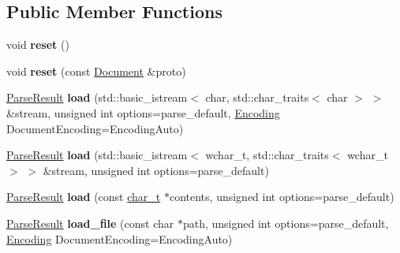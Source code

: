 \subsection*{Public Member Functions}
\begin{DoxyCompactItemize}
\item 
\hypertarget{classphys_1_1xml_1_1Document_aadb3e68da9cf95b1193f915136f9a7e5}{
void {\bfseries reset} ()}
\label{dd/d44/classphys_1_1xml_1_1Document_aadb3e68da9cf95b1193f915136f9a7e5}

\item 
\hypertarget{classphys_1_1xml_1_1Document_a8d79b0e71457e8a64f331fd4cc117a86}{
void {\bfseries reset} (const \hyperlink{classphys_1_1xml_1_1Document}{Document} \&proto)}
\label{dd/d44/classphys_1_1xml_1_1Document_a8d79b0e71457e8a64f331fd4cc117a86}

\item 
\hypertarget{classphys_1_1xml_1_1Document_a2aca8fd20c696d191b0c1daf980905d5}{
\hyperlink{structphys_1_1xml_1_1ParseResult}{ParseResult} {\bfseries load} (std::basic\_\-istream$<$ char, std::char\_\-traits$<$ char $>$ $>$ \&stream, unsigned int options=parse\_\-default, \hyperlink{namespacephys_1_1xml_a420f5de782438f88160321385bea2015}{Encoding} DocumentEncoding=EncodingAuto)}
\label{dd/d44/classphys_1_1xml_1_1Document_a2aca8fd20c696d191b0c1daf980905d5}

\item 
\hypertarget{classphys_1_1xml_1_1Document_a09d74505371b5746d4762daa20a7bb25}{
\hyperlink{structphys_1_1xml_1_1ParseResult}{ParseResult} {\bfseries load} (std::basic\_\-istream$<$ wchar\_\-t, std::char\_\-traits$<$ wchar\_\-t $>$ $>$ \&stream, unsigned int options=parse\_\-default)}
\label{dd/d44/classphys_1_1xml_1_1Document_a09d74505371b5746d4762daa20a7bb25}

\item 
\hypertarget{classphys_1_1xml_1_1Document_a1551e495e2b83897bd8288fc001c6c54}{
\hyperlink{structphys_1_1xml_1_1ParseResult}{ParseResult} {\bfseries load} (const \hyperlink{namespacephys_1_1xml_afc87705cd1c2917d87b879715a2d8f6e}{char\_\-t} $\ast$contents, unsigned int options=parse\_\-default)}
\label{dd/d44/classphys_1_1xml_1_1Document_a1551e495e2b83897bd8288fc001c6c54}

\item 
\hypertarget{classphys_1_1xml_1_1Document_a4b13cb02a075071d56125b1daaf429a8}{
\hyperlink{structphys_1_1xml_1_1ParseResult}{ParseResult} {\bfseries load\_\-file} (const char $\ast$path, unsigned int options=parse\_\-default, \hyperlink{namespacephys_1_1xml_a420f5de782438f88160321385bea2015}{Encoding} DocumentEncoding=EncodingAuto)}
\label{dd/d44/classphys_1_1xml_1_1Document_a4b13cb02a075071d56125b1daaf429a8}


\end{DoxyCompactItemize}
